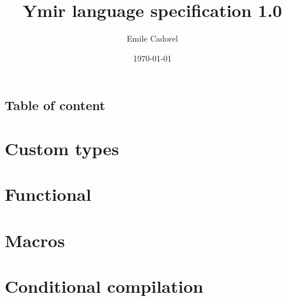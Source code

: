 \documentclass[twoside,a4paper,11pt]{book}
\author{Emile Cadorel}
\date{\today}
\title{Ymir language specification 1.0}
\begin{document}
\setlength{\aweboxleftmargin}{0.05\linewidth}
\setlength{\aweboxcontentwidth}{0.93\linewidth}


\maketitle
\dominitoc
\dominilof
\dominilot



\section*{Table of content}
%
\tableofcontents
%









\chapter{Custom types}%
\label{chap:custom_types}

\minitoc%

%

\chapter{Functional}
\label{chap:functional}

%
\minitoc%

%

\chapter{Macros}
\label{chap:macros}


\minitoc%
%



\chapter{Conditional compilation}
\label{chap:conditional_compilation}


\minitoc%
%
\end{document}
